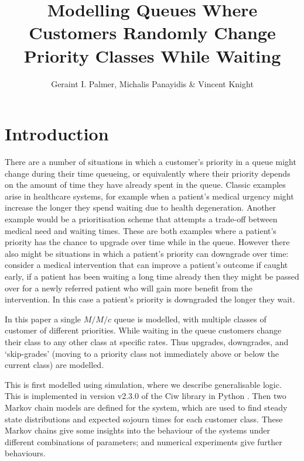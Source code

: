 \documentclass{article}
\title{Modelling Queues Where Customers Randomly Change Priority Classes While Waiting}
\author{Geraint I. Palmer, Michalis Panayidis \& Vincent Knight}
\date{}
\begin{document}
\maketitle

\section{Introduction}
There are a number of situations in which a customer's priority in a queue might
change during their time queueing, or equivalently where their priority depends
on the amount of time they have already spent in the queue.
Classic examples arise in healthcare systems, for example when a patient's
medical urgency might increase the longer they spend waiting due to health
degeneration. Another example would be a prioritisation scheme that attempts a
trade-off between medical need and waiting times.
These are both examples where a patient's priority has the chance to upgrade
over time while in the queue.
However there also might be situations in which a patient's priority can
downgrade over time: consider a medical intervention that can improve a
patient's outcome if caught early, if a patient has been waiting a long time
already then they might be passed over for a newly referred patient who will
gain more benefit from the intervention. In this case a patient's priority is
downgraded the longer they wait.

In this paper a single $M/M/c$ queue is modelled, with multiple classes of
customer of different priorities. While waiting in the queue customers change
their class to any other class at specific rates. Thus upgrades, downgrades, and
`skip-grades' (moving to a priority class not immediately above or below the
current class) are modelled.

This is first modelled using simulation, where we describe generalisable logic.
This is implemented in version v2.3.0 of the Ciw library in Python
\cite{palmer19}.
Then two Markov chain models are defined for the system, which are used to find
steady state distributions and expected sojourn times for each customer class.
These Markov chains give some insights into the behaviour of the systems under
different combinations of parameters; and numerical experiments give further
behaviours.
\end{document}
